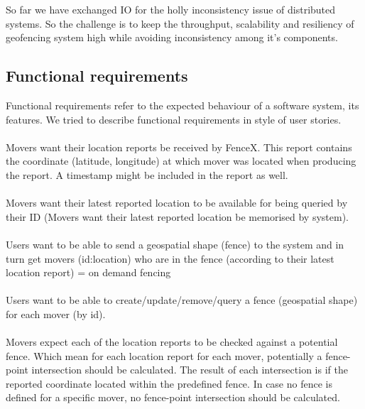 \documentclass[a4]{report}
\begin{document}
    So far we have exchanged IO for the holly inconsistency issue of distributed systems.
    So the challenge is to keep the throughput, scalability and resiliency of geofencing system high while avoiding
    inconsistency among it's components.

    \subsection{Functional requirements}
    Functional requirements refer to the expected behaviour of a software system, its features.
    We tried to describe functional requirements in style of user stories\cite{userStory}.

    \paragraph{}
    Movers want their location reports be received by FenceX.
    This report contains the coordinate (latitude, longitude) at which mover was located when producing the report.
    A timestamp might be included in the report as well.

    \paragraph{}
    Movers want their latest reported location to be available for being queried by their ID (Movers want their
    latest reported location be memorised by system).

    \paragraph{}
    Users want to be able to send a geospatial shape (fence) to the system and in turn get movers (id:location) who
    are in the fence (according to their latest location report) = on demand fencing

    \paragraph{}
    Users want to be able to create/update/remove/query a fence (geospatial shape) for each mover (by id).

    \paragraph{}
    Movers expect each of the location reports to be checked against a potential fence.
    Which mean for each location report for each mover, potentially a fence-point intersection should be calculated.
    The result of each intersection is if the reported coordinate located within the predefined fence.
    In case no fence is defined for a specific mover, no fence-point intersection should be calculated.
\end{document}
